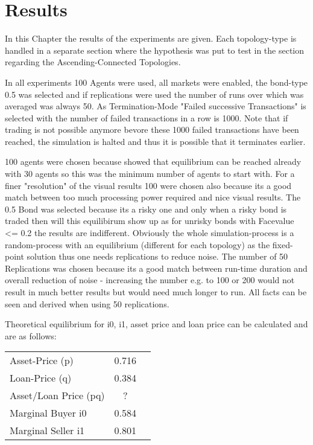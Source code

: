 \documentclass[Bachelorarbeit.tex]{subfiles}
\begin{document}
\chapter{Results}

In this Chapter the results of the experiments are given. Each topology-type is handled in a separate section where the hypothesis was put to test in the section regarding the Ascending-Connected Topologies.

In all experiments 100 Agents were used, all markets were enabled, the bond-type 0.5 was selected and if replications were used the number of runs over which was averaged was always 50.
As Termination-Mode "Failed successive Transactions" is selected with the number of failed transactions in a row is 1000. Note that if trading is not possible anymore bevore these 1000 failed transactions have been reached, the simulation is halted and thus it is possible that it terminates earlier.

100 agents were chosen because \cite{Breuer2015} showed that equilibrium can be reached already with 30 agents so this was the minimum number of agents to start with. For a finer "resolution" of the visual results 100 were chosen also because its a good match between too much processing power required and nice visual results.
The 0.5 Bond was selected because its a risky one and only when a risky bond is traded then will this equilibirum show up as for unrisky bonds with Facevalue <= 0.2 the results are indifferent.
Obviously the whole simulation-process is a random-process with an equilibrium (different for each topology) as the fixed-point solution thus one needs replications to reduce noise. The number of 50 Replications was chosen because its a good match between run-time duration and overall reduction of noise - increasing the number e.g. to 100 or 200 would not result in much better results but would need much longer to run. All facts can be seen and derived when using 50 replications.

Theoretical equilibrium for i0, i1, asset price and loan price can be calculated and are as follows:

\begin{tabular} { l c r }
	Asset-Price (p) & 0.716 \\
	Loan-Price (q) & 0.384 \\
	Asset/Loan Price (pq) & ? \\
	Marginal Buyer i0 & 0.584 \\
	Marginal Seller i1 & 0.801 \\
\end{tabular}
\end{document}
